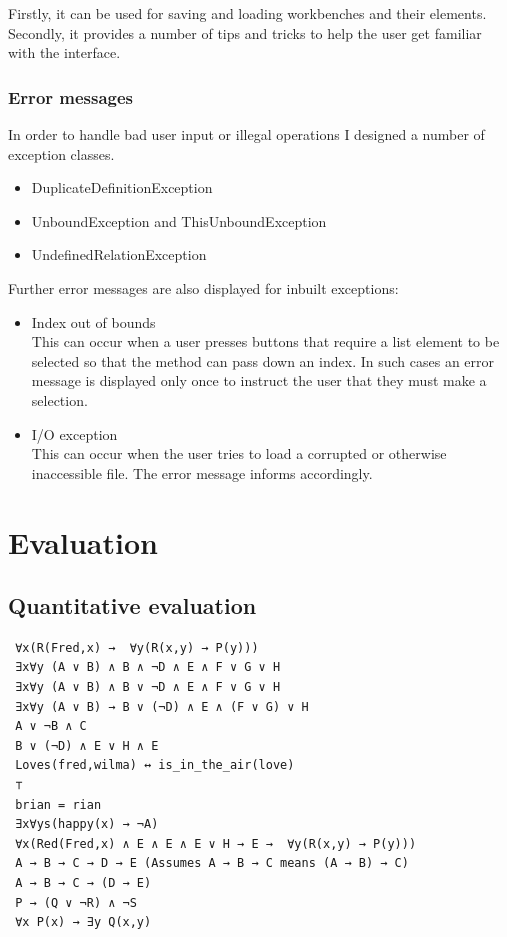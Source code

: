 \documentclass{report}
\begin{document}
Firstly, it can be used for saving and loading workbenches and their elements.\\
Secondly, it provides a number of tips and tricks to help the user get familiar with the interface.

\subsection{Error messages}
In order to handle bad user input or illegal operations I designed a number of exception classes.

\begin{itemize}
\item DuplicateDefinitionException
\item UnboundException and ThisUnboundException
\item UndefinedRelationException
\end{itemize}

Further error messages are also displayed for inbuilt exceptions:

\begin{itemize}
\item Index out of bounds\\
This can occur when a user presses buttons that require a list element to be selected so that the method can pass down an index. In such cases an error message is displayed only once to instruct the user that they must make a selection.
\item I/O exception\\
This can occur when the user tries to load a corrupted or otherwise inaccessible file. The error message informs accordingly.
\end{itemize}


\chapter{Evaluation}
\section{Quantitative evaluation}
\begin{verbatim}
 ∀x(R(Fred,x) →  ∀y(R(x,y) → P(y)))
 ∃x∀y (A ∨ B) ∧ B ∧ ¬D ∧ E ∧ F ∨ G ∨ H
 ∃x∀y (A ∨ B) ∧ B ∨ ¬D ∧ E ∧ F ∨ G ∨ H
 ∃x∀y (A ∨ B) → B ∨ (¬D) ∧ E ∧ (F ∨ G) ∨ H
 A ∨ ¬B ∧ C
 B ∨ (¬D) ∧ E ∨ H ∧ E
 Loves(fred,wilma) ↔ is_in_the_air(love)
 ⊤
 brian = rian
 ∃x∀ys(happy(x) → ¬A)
 ∀x(Red(Fred,x) ∧ E ∧ E ∧ E ∨ H → E →  ∀y(R(x,y) → P(y)))
 A → B → C → D → E (Assumes A → B → C means (A → B) → C)
 A → B → C → (D → E)
 P → (Q ∨ ¬R) ∧ ¬S
 ∀x P(x) → ∃y Q(x,y)
\end{verbatim}
\end{document}
